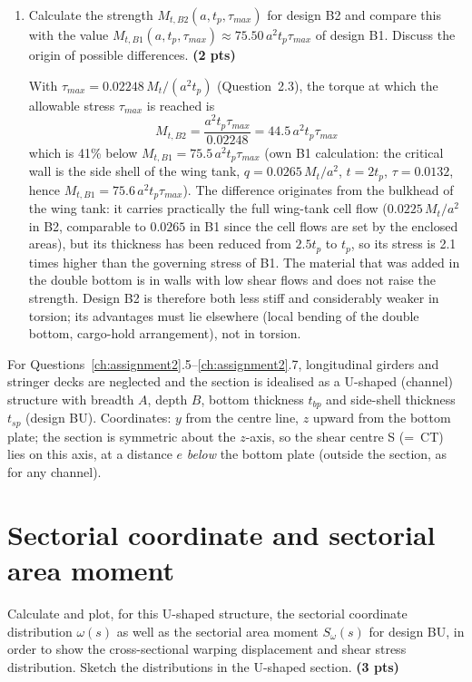 \begin{enumerate}[label=\alph*.]
  \item Calculate the strength $M_{t,B2}(a,t_p,\tau_{max})$ for design B2 and compare this with the value $M_{t,B1}(a,t_p,\tau_{max})\approx75.50\,a^2t_p\tau_{max}$ of design B1. Discuss the origin of possible differences. \textbf{(2 pts)}

  With $\tau_{max}=0.02248\,M_t/(a^2t_p)$ (Question~2.3), the torque at which the allowable stress $\tau_{max}$ is reached is
  \begin{equation}
    \boxed{\;M_{t,B2}=\frac{a^2t_p\tau_{max}}{0.02248}=44.5\,a^2t_p\tau_{max}\;}
  \end{equation}
  which is 41\% below $M_{t,B1}=75.5\,a^2t_p\tau_{max}$ (own B1 calculation: the critical wall is the side shell of the wing tank, $q=0.0265\,M_t/a^2$, $t=2t_p$, $\tau=0.0132$, hence $M_{t,B1}=75.6\,a^2t_p\tau_{max}$). The difference originates from the bulkhead of the wing tank: it carries practically the full wing-tank cell flow ($0.0225\,M_t/a^2$ in B2, comparable to $0.0265$ in B1 since the cell flows are set by the enclosed areas), but its thickness has been reduced from $2.5t_p$ to $t_p$, so its stress is 2.1 times higher than the governing stress of B1. The material that was added in the double bottom is in walls with low shear flows and does not raise the strength. Design B2 is therefore both less stiff and considerably weaker in torsion; its advantages must lie elsewhere (local bending of the double bottom, cargo-hold arrangement), not in torsion.
\end{enumerate}

\bigskip
For Questions~\ref{ch:assignment2}.5--\ref{ch:assignment2}.7, longitudinal girders and stringer decks are neglected and the section is idealised as a U-shaped (channel) structure with breadth $A$, depth $B$, bottom thickness $t_{bp}$ and side-shell thickness $t_{sp}$ (design BU). Coordinates: $y$ from the centre line, $z$ upward from the bottom plate; the section is symmetric about the $z$-axis, so the shear centre S (=~CT) lies on this axis, at a distance $e$ \emph{below} the bottom plate (outside the section, as for any channel).

\section{Sectorial coordinate and sectorial area moment}

Calculate and plot, for this U-shaped structure, the sectorial coordinate distribution $\omega(s)$ as well as the sectorial area moment $S_\omega(s)$ for design BU, in order to show the cross-sectional warping displacement and shear stress distribution. Sketch the distributions in the U-shaped section. \textbf{(3 pts)}

